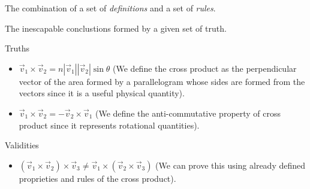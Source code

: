 \begin{definition}[Truth]
    The combination of a set of \textit{definitions} and a set of \textit{rules}.
\end{definition}
\begin{definition}[Validity]
    The inescapable conclustions formed by a given set of truth.
\end{definition}

\begin{example}
    Truths
    \begin{itemize}
        \item $\vec{v}_{1}\times \vec{v}_{2}=n|\vec{v}_{1}||\vec{v}_{2}|\sin\theta$ (We define the cross product as the perpendicular vector of the area formed by a parallelogram whose sides are formed from the vectors since it is a useful physical quantity).
        \item $\vec{v}_{1}\times \vec{v}_{2}=-\vec{v}_{2}\times \vec{v}_{1}$ (We define the anti-commutative property of cross product since it represents rotational quantities).
    \end{itemize}
\end{example}
\begin{example}
    Validities
    \begin{itemize}
        \item $(\vec{v}_{1}\times \vec{v}_{2})\times \vec{v}_{3}\not=\vec{v}_{1}\times (\vec{v}_{2}\times \vec{v}_{3})$ (We can prove this using already defined proprieties and rules of the cross product).
    \end{itemize}
\end{example}

\newpage
